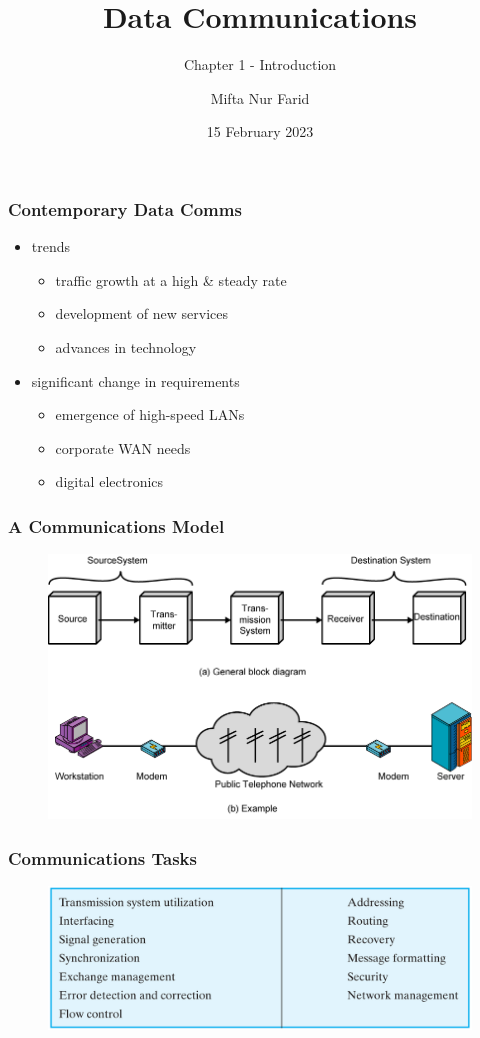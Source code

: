 \documentclass[pdflatex,compress]{beamer}
\title{Data Communications}
\subtitle{Chapter 1 - Introduction}
\author{Mifta Nur Farid}
\date{15 February 2023}
\begin{document}
\maketitle

\begin{frame}
	\frametitle{Contemporary Data Comms}
	\begin{itemize}
		\item trends
		\begin{itemize}
			\item traffic growth at a high \& steady rate
			\item development of new services
			\item advances in technology
		\end{itemize}
		\item significant change in requirements
		\begin{itemize}
			\item emergence of high-speed LANs
			\item corporate WAN needs
			\item digital electronics
		\end{itemize}
	\end{itemize}
\end{frame}

\begin{frame}
	\frametitle{A Communications Model}
	\begin{figure}
		\centering
		\includegraphics[width=\linewidth]{img/img01}
		\label{fig:img01}
	\end{figure}
\end{frame}

\begin{frame}
	\frametitle{Communications Tasks}
	\begin{figure}
		\centering
		\includegraphics[width=\linewidth]{img/img02}
		\label{fig:img02}
	\end{figure}
\end{frame}
\end{document}
